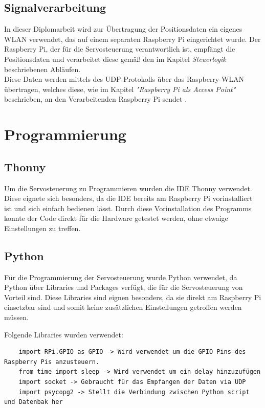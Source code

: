 \subsection{Signalverarbeitung}
In dieser Diplomarbeit wird zur Übertragung der Positionsdaten ein eigenes WLAN verwendet, das auf einem separaten Raspberry Pi eingerichtet wurde. Der Raspberry Pi, der für die Servosteuerung verantwortlich ist, empfängt die Positionsdaten und verarbeitet diese gemäß den im Kapitel \textit{Steuerlogik} beschriebenen Abläufen. \\
Diese Daten werden mittels des UDP-Protokolls über das Raspberry-WLAN übertragen, welches diese, wie im Kapitel \textit{"Raspberry Pi als Access Point"} beschrieben, an den Verarbeitenden Raspberry Pi sendet	.

\section{Programmierung}
\subsection{Thonny}
Um die Servosteuerung zu Programmieren wurden die IDE Thonny verwendet. Diese eignete sich besonders, da die IDE bereits am Raspberry Pi vorinstalliert ist und sich einfach bedienen lässt. Durch diese Vorinstallation des Programms konnte der Code direkt für die Hardware getestet werden, ohne etwaige Einstellungen zu treffen.

\subsection{Python}
Für die Programmierung der Servosteuerung wurde Python verwendet, da Python über Libraries und Packages verfügt, die für die Servosteuerung von Vorteil sind. Diese Libraries sind eignen besonders, da sie direkt am Raspberry Pi einsetzbar sind und somit keine zusätzlichen Einstellungen getroffen werden müssen.

Folgende Libraries wurden verwendet:

\begin{lstlisting}
	import RPi.GPIO as GPIO -> Wird verwendet um die GPIO Pins des Raspberry Pis anzusteuern.
	from time import sleep -> Wird verwendet um ein delay hinzuzufügen
	import socket -> Gebraucht für das Empfangen der Daten via UDP
	import psycopg2 -> Stellt die Verbindung zwischen Python script und Datenbak her
\end{lstlisting}

